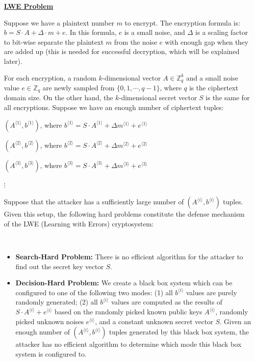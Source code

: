 \begin{tcolorbox}[title={\textbf{\tboxlabel{\ref*{subsec:lattice-overview}} The LWE (Learning with Errors) and RLWE Problems}}]
\textbf{\underline{LWE Problem}}

Suppose we have a plaintext number $m$ to encrypt. The encryption formula is: $b = S \cdot A + \Delta \cdot m + e$. In this formula, $e$ is a small noise, and $\Delta$ is a scaling factor to bit-wise separate the plaintext $m$ from the noise $e$ with enough gap when they are added up (this is needed for successful decryption, which will be explained later). 

For each encryption, a random $k$-dimensional vector $A \in \mathbb{Z}_q^k$ and a small noise value $e \in \mathbb{Z}_q$ are newly sampled from $\{0, 1, \cdots, q - 1\}$, where $q$ is the ciphertext domain size. On the other hand, the $k$-dimensional secret vector $S$ is the same for all encryptions. Suppose we have an enough number of ciphertext tuples: 

$(A^{\langle 1 \rangle}, b^{\langle 1 \rangle})$, where $b^{\langle 1 \rangle} = S \cdot A^{\langle 1 \rangle} + \Delta m^{\langle 1 \rangle} + e^{\langle 1 \rangle}$ 

$(A^{\langle 2 \rangle}, b^{\langle 2 \rangle})$, where $b^{\langle 2 \rangle} = S \cdot A^{\langle 2 \rangle} + \Delta m^{\langle 2 \rangle} + e^{\langle 2 \rangle}$ 

$(A^{\langle 3 \rangle}, b^{\langle 3 \rangle})$, where $b^{\langle 3 \rangle} = S \cdot A^{\langle 3 \rangle} + \Delta m^{\langle 3 \rangle} + e^{\langle 3 \rangle}$ 

\text{ } $\vdots$

Suppose that the attacker has a sufficiently large number of $(A^{\langle i \rangle}, b^{\langle i \rangle})$ tuples. Given this setup, the following hard problems constitute the defense mechanism of the LWE (Learning with Errors) cryptosystem:

$ $

\begin{itemize}
\item \textbf{Search-Hard Problem:} There is no efficient algorithm for the attacker to find out the secret key vector $S$.
\item \textbf{Decision-Hard Problem:} We create a black box system which can be configured to one of the following two modes: (1) all $b^{\langle i\rangle}$ values are purely randomly generated; (2) all $b^{\langle i\rangle}$ values are computed as the results of $S \cdot A^{\langle i\rangle} + e^{\langle i\rangle}$ based on the randomly picked known public keys $A^{\langle i \rangle}$, randomly picked unknown noises $e^{\langle i\rangle}$, and a constant unknown secret vector $S$. Given an enough number of $(A^{\langle i \rangle}, b^{\langle i \rangle})$ tuples generated by this black box system, the attacker has no efficient algorithm to determine which mode this black box system is configured to.
\end{itemize}


\end{tcolorbox}
